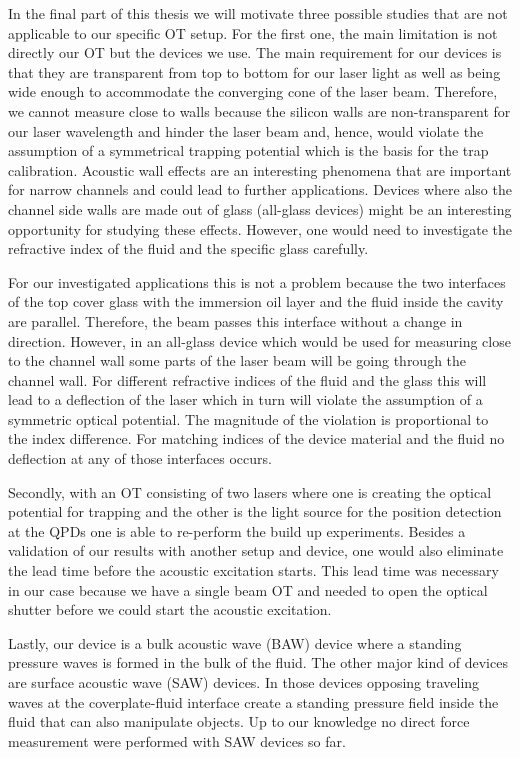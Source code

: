 In the final part of this thesis we will motivate three possible studies that 
are not applicable to our specific OT setup. For the first one, the main 
limitation is not directly our OT but the devices we use. The main requirement 
for our devices is that they are transparent from top to bottom for our laser 
light as well as being wide enough to accommodate the converging cone of the 
laser beam. Therefore, we cannot measure close to walls because the silicon 
walls are non-transparent for our laser wavelength and hinder the laser beam 
and, hence, would violate the assumption of a symmetrical trapping potential 
which is the basis for the trap calibration. Acoustic wall effects are an 
interesting phenomena that are important for narrow channels and could lead to 
further applications. Devices where also the channel side walls are made out of 
glass (all-glass devices) might be an interesting opportunity for studying 
these effects. However, one would need to investigate the refractive index of 
the fluid and the specific glass carefully.

For our investigated applications this is not a problem because the two 
interfaces of the top cover glass with the immersion oil layer and the fluid 
inside the cavity are parallel. Therefore, the beam passes this interface 
without a change in direction. However, in an all-glass device which would be 
used for measuring close to the channel wall some parts of the laser beam will 
be going through the channel wall. For different refractive indices of the 
fluid and the glass this will lead to a deflection of the laser which in turn 
will violate the assumption of a symmetric optical potential. The magnitude of 
the violation is proportional to the index difference. For matching indices of 
the device material and the fluid no deflection at any of those interfaces 
occurs.

Secondly, with an OT consisting of two lasers where one is creating the optical 
potential for trapping and the other is the light source for the position 
detection at the QPDs one is able to re-perform the build up experiments. 
Besides a validation of our results with another setup and device, one would 
also eliminate the lead time before the acoustic excitation starts. This lead 
time was necessary in our case because we have a single beam OT and needed to 
open the optical shutter before we could start the acoustic excitation.

Lastly, our device is a bulk acoustic wave (BAW) device where a standing 
pressure waves is formed in the bulk of the fluid. The other major kind of 
devices are surface acoustic wave (SAW) devices. In those devices opposing 
traveling waves at the coverplate-fluid interface create a standing pressure 
field inside the fluid that can also manipulate objects. Up to our knowledge no 
direct force measurement were performed with SAW devices so far.
